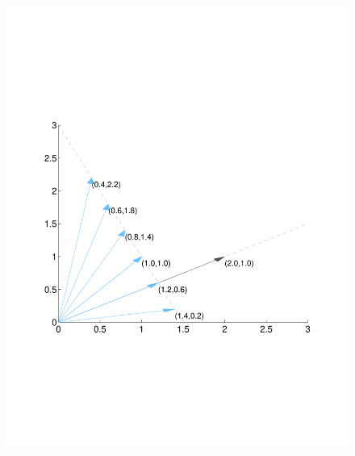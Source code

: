 \documentclass[a4paper,12pt]{scrartcl}
\begin{document}
\begin{figure}[htpb!]
  \centering
  \includegraphics[scale=0.5, trim={2cm, 7cm, 2cm, 7cm}, clip]{Plots/StateSpaceGeometry5.pdf}
\end{figure}
\end{document}

